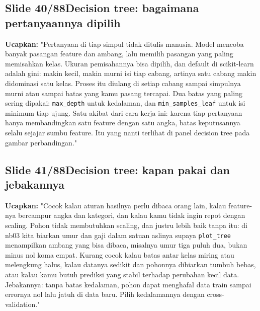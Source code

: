 \documentclass[11pt]{article}
\renewcommand{\framebox}[1]{\colorbox{acc!15}{\textcolor{acc}{\textbf{#1}}}}
\begin{document}
\subsection*{\framebox{Slide 40/88}\quad Decision tree: bagaimana pertanyaannya dipilih}
\textbf{Ucapkan:} "Pertanyaan di tiap simpul tidak ditulis manusia. Model mencoba banyak pasangan feature dan ambang, lalu memilih pasangan yang paling memisahkan kelas. Ukuran pemisahannya bisa dipilih, dan default di scikit-learn adalah gini: makin kecil, makin murni isi tiap cabang, artinya satu cabang makin didominasi satu kelas. Proses itu diulang di setiap cabang sampai simpulnya murni atau sampai batas yang kamu pasang tercapai. Dua batas yang paling sering dipakai: \texttt{max\_depth} untuk kedalaman, dan \texttt{min\_samples\_leaf} untuk isi minimum tiap ujung. Satu akibat dari cara kerja ini: karena tiap pertanyaan hanya membandingkan satu feature dengan satu angka, batas keputusannya selalu sejajar sumbu feature. Itu yang nanti terlihat di panel decision tree pada gambar perbandingan."\\[2pt]

\subsection*{\framebox{Slide 41/88}\quad Decision tree: kapan pakai dan jebakannya}
\textbf{Ucapkan:} "Cocok kalau aturan hasilnya perlu dibaca orang lain, kalau feature-nya bercampur angka dan kategori, dan kalau kamu tidak ingin repot dengan scaling. Pohon tidak membutuhkan scaling, dan justru lebih baik tanpa itu: di nb03 kita biarkan umur dan gaji dalam satuan aslinya supaya \texttt{plot\_tree} menampilkan ambang yang bisa dibaca, misalnya umur tiga puluh dua, bukan minus nol koma empat. Kurang cocok kalau batas antar kelas miring atau melengkung halus, kalau datanya sedikit dan pohonnya dibiarkan tumbuh bebas, atau kalau kamu butuh prediksi yang stabil terhadap perubahan kecil data. Jebakannya: tanpa batas kedalaman, pohon dapat menghafal data train sampai errornya nol lalu jatuh di data baru. Pilih kedalamannya dengan cross-validation."\\[2pt]
\end{document}
